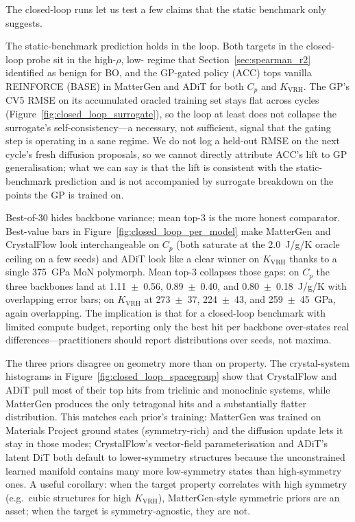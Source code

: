 The closed-loop runs let us test a few claims that the static benchmark only suggests.

The static-benchmark prediction holds in the loop.
Both targets in the closed-loop probe sit in the high-$\rho$, low-\Rtwo{} regime that Section~\ref{sec:spearman_r2} identified as benign for BO, and the GP-gated policy (ACC) tops vanilla REINFORCE (BASE) in MatterGen and ADiT for both $C_p$ and $K_{\text{VRH}}$.
The GP's CV5 RMSE on its accumulated oracled training set stays flat across cycles (Figure~\ref{fig:closed_loop_surrogate}), so the loop at least does not collapse the surrogate's self-consistency---a necessary, not sufficient, signal that the gating step is operating in a sane regime.
We do not log a held-out RMSE on the next cycle's fresh diffusion proposals, so we cannot directly attribute ACC's lift to GP generalisation; what we can say is that the lift is consistent with the static-benchmark prediction and is not accompanied by surrogate breakdown on the points the GP is trained on.

Best-of-30 hides backbone variance; mean top-3 is the more honest comparator.
Best-value bars in Figure~\ref{fig:closed_loop_per_model} make MatterGen and CrystalFlow look interchangeable on $C_p$ (both saturate at the 2.0~J/g/K oracle ceiling on a few seeds) and ADiT look like a clear winner on $K_{\text{VRH}}$ thanks to a single 375~GPa MoN polymorph.
Mean top-3 collapses those gaps: on $C_p$ the three backbones land at 1.11~$\pm$~0.56, 0.89~$\pm$~0.40, and 0.80~$\pm$~0.18~J/g/K with overlapping error bars; on $K_{\text{VRH}}$ at 273~$\pm$~37, 224~$\pm$~43, and 259~$\pm$~45~GPa, again overlapping.
The implication is that for a closed-loop benchmark with limited compute budget, reporting only the best hit per backbone over-states real differences---practitioners should report distributions over seeds, not maxima.

The three priors disagree on geometry more than on property.
The crystal-system histograms in Figure~\ref{fig:closed_loop_spacegroup} show that CrystalFlow and ADiT pull most of their top hits from triclinic and monoclinic systems, while MatterGen produces the only tetragonal hits and a substantially flatter distribution.
This matches each prior's training: MatterGen was trained on Materials Project ground states (symmetry-rich) and the diffusion update lets it stay in those modes; CrystalFlow's vector-field parameterisation and ADiT's latent DiT both default to lower-symmetry structures because the unconstrained learned manifold contains many more low-symmetry states than high-symmetry ones.
A useful corollary: when the target property correlates with high symmetry (e.g.\ cubic structures for high $K_{\text{VRH}}$), MatterGen-style symmetric priors are an asset; when the target is symmetry-agnostic, they are not.

